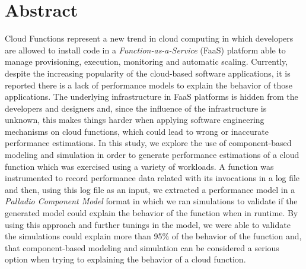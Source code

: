 \section*{Abstract}
Cloud Functions represent a new trend in cloud computing in which developers are allowed to install code in a \emph{Function-as-a-Service} (FaaS) platform able to manage provisioning, execution, monitoring and automatic scaling. Currently, despite the increasing popularity of the cloud-based software applications, it is reported there is a lack of performance models to explain the behavior of those applications. The underlying infrastructure in FaaS platforms is hidden from the developers and designers and, since the influence of the infrastructure is unknown, this makes things harder when applying software engineering mechanisms on cloud functions, which could lead to wrong or inaccurate performance estimations. In this study, we explore the use of component-based modeling and simulation in order to generate performance estimations of a cloud function which was exercised using a variety of workloads. A function was instrumented to record performance data related with its invocations in a log file and then, using this log file as an input, we extracted a performance model in a \emph{Palladio Component Model} format in which we ran simulations to validate if the generated model could explain the behavior of the function when in runtime. By using this approach and further tunings in the model, we were able to validate the simulations could explain more than 95\% of the behavior of the function and, that component-based modeling and simulation can be considered a serious option when trying to explaining the behavior of a cloud function.

\newpage